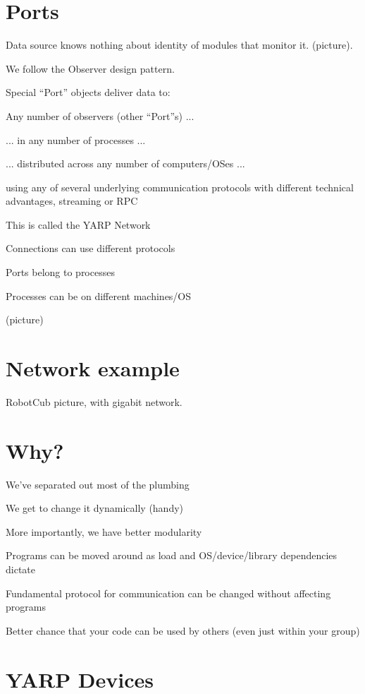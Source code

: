 

\section{Ports}

Data source knows nothing about identity of modules that monitor it.
(picture).

We follow the Observer design pattern. 

Special ``Port'' objects deliver data to:

Any number of observers (other ``Port''s) ...

... in any number of processes ...

... distributed across any number of computers/OSes ...

using any of several underlying communication protocols with different
technical advantages, streaming or RPC

This is called the YARP Network

Connections can use different protocols

Ports belong to processes

Processes can be on different machines/OS

(picture)

\section{Network example}

RobotCub picture, with gigabit network.

\section{Why?}

We've separated out most of the plumbing

We get to change it dynamically (handy)

More importantly, we have better modularity

Programs can be moved around as load and OS/device/library
 dependencies dictate

Fundamental protocol for communication can be changed without 
affecting programs

Better chance that your code can be used by others (even just within 
your group)


\section{YARP Devices}

